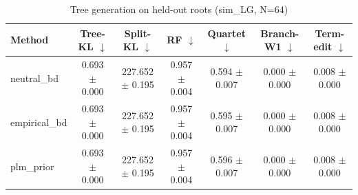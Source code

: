\begin{table}[t]\centering
\caption{Tree generation on held-out roots (sim_LG, N=64)}
\begin{tabular}{lcccccc}
\toprule
Method & Tree-KL $\downarrow$ & Split-KL $\downarrow$ & RF $\downarrow$ & Quartet $\downarrow$ & Branch-W1 $\downarrow$ & Term-edit $\downarrow$ \\
\midrule
neutral\_bd & 0.693 $\pm$ 0.000 & 227.652 $\pm$ 0.195 & 0.957 $\pm$ 0.004 & 0.594 $\pm$ 0.007 & 0.000 $\pm$ 0.000 & 0.008 $\pm$ 0.000 \\
empirical\_bd & 0.693 $\pm$ 0.000 & 227.652 $\pm$ 0.195 & 0.957 $\pm$ 0.004 & 0.595 $\pm$ 0.007 & 0.000 $\pm$ 0.000 & 0.008 $\pm$ 0.000 \\
plm\_prior & 0.693 $\pm$ 0.000 & 227.652 $\pm$ 0.195 & 0.957 $\pm$ 0.004 & 0.596 $\pm$ 0.007 & 0.000 $\pm$ 0.000 & 0.008 $\pm$ 0.000 \\
\bottomrule
\end{tabular}
\end{table}
